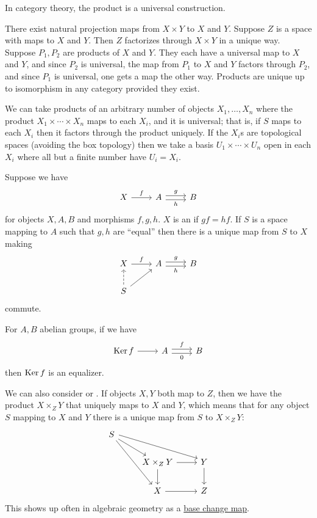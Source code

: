 \documentclass[11pt, oneside]{article}
\begin{document}
In category theory, the product is a universal construction. 

There exist natural projection maps from $X\times Y$ to $X$ and $Y$. Suppose $Z$ is a space with maps to $X$ and $Y$. Then $Z$ factorizes through $X\times Y$ in a unique way. Suppose $P_1,P_2$ are products of $X $ and $Y$. They each have a universal map to $X$ and $Y$, and since $P_2$ is universal, the map from $P_1$ to $X$ and $Y$ factors through $P_2$, and since $P_1$ is universal, one gets a map the other way. Products are unique up to isomorphism in any category provided they exist.

We can take products of an arbitrary number of objects $X_1,\hdots,X_n$ where the product $X_1\times\cdots\times X_n$ maps to each $X_i$, and it is universal; that is, if $S$ maps to each $X_i$ then it factors through the product uniquely. If the $X_i$s are topological spaces (avoiding the box topology) then we take a basis $U_1\times\cdots\times U_n$ open in each $X_i$ where all but a finite number have $U_i=X_i$.

Suppose we have
\[
\begin{tikzcd}
X\arrow[r, "f"] &A \arrow[r, shift left, "g"]\arrow[r, shift right, swap, "h"]& B
\end{tikzcd}
\]
for objects $X, A,B$ and morphisms $f,g,h$. $X$ is an \href{https://en.wikipedia.org/wiki/Equaliser_(mathematics)}{} if $gf=hf$. If $S$ is a space mapping to $A$ such that $g,h$ are ``equal'' then there is a unique map from $S$ to $X$ making 
\[
\begin{tikzcd}
X\arrow[r, "f"] &A \arrow[r, shift left, "g"]\arrow[r, shift right, swap, "h"]& B\\
S \arrow[ru] \arrow[u, dashed]
\end{tikzcd}
\]
commute. 

For $A, B$ abelian groups, if we have
\[
\begin{tikzcd}
\Ker f \arrow[r] &A \arrow[r, shift left, "f"]\arrow[r, shift right, swap, "0"]& B
\end{tikzcd}
\]
then $\operatorname{Ker} f$ is an equalizer.

We can also consider \href{https://en.wikipedia.org/wiki/Pullback_(category_theory)}{} or \href{https://en.wikipedia.org/wiki/Pullback_(category_theory)}{}. If objects $X,Y$ both map to $Z$, then we have the product $X\times_Z Y$ that uniquely maps to $X$ and $Y$, which means that for any object $S$ mapping to $X$ and $Y$ there is a unique map from $S $ to $X\times_Z Y$:
\[
\begin{tikzcd}
S \arrow [dr] \arrow[drr, shift left] \arrow[ddr] &&\\
&X\times_Z Y \arrow[r] \arrow[d]& Y\arrow[d]\\
& X\arrow[r]&Z
\end{tikzcd}
\]
This shows up often in algebraic geometry as a \href{https://en.wikipedia.org/wiki/Base_change_theorems}{\color{black}base change map}.
\end{document}
